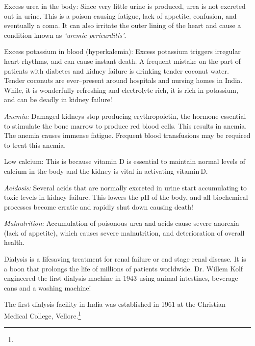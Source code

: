 \item Excess urea in the body: Since very little urine is produced, urea is not excreted out in urine. This is a poison causing fatigue, lack of appetite, confusion, and eventually a coma. It can also irritate the outer lining of the heart and cause a condition known as \textit{‘uremic pericarditis’}.

 \item Excess potassium in blood (hyperkalemia): Excess potassium triggers irregular heart rhythms, and can cause instant death. A frequent mistake on the part of patients with diabetes and kidney failure is drinking tender coconut water. Tender coconuts are ever–present around hospitals and nursing homes in India. While, it is wonderfully refreshing and electrolyte rich, it is rich in potassium, and can be deadly in kidney failure!

 \item \textit{Anemia:} Damaged kidneys stop producing erythropoietin, the hormone essential to stimulate the bone marrow to produce red blood cells. This results in anemia. The anemia causes immense fatigue. Frequent blood transfusions may be required to treat this anemia.

 \item Low calcium: This is because vitamin D is essential to maintain normal levels of calcium in the body and the kidney is vital in activating vitamin D.

 \item \textit{Acidosis:} Several acids that are normally excreted in urine start accumulating to toxic levels in kidney failure. This lowers the pH of the body, and all biochemical processes become erratic and rapidly shut down causing death!

 \item \textit{Malnutrition:} Accumulation of poisonous urea and acids cause severe anorexia (lack of appetite), which causes severe malnutrition, and deterioration of overall health.


Dialysis is a lifesaving treatment for renal failure or end stage renal disease. It is a boon that prolongs the life of millions of patients worldwide. Dr. Willem Kolf engineered the first dialysis machine in 1943 using animal intestines, beverage cans and a washing machine!

The first dialysis facility in India was established in 1961 at the Christian Medical College, Vellore.\footnote{}

